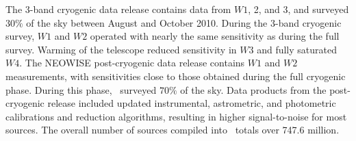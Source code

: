 The 3-band cryogenic data release contains data from $W1$, 2, and 3, and surveyed $30\%$ of the sky between August and October 2010. During the 3-band cryogenic survey, $W1$ and $W2$ operated with nearly the same sensitivity as during the full survey. Warming of the telescope reduced sensitivity in $W3$ and fully saturated $W4$. The NEOWISE post-cryogenic data release contains $W1$ and $W2$ measurements, with sensitivities close to those obtained during the full cryogenic phase. During this phase, \wise\, surveyed $70\%$ of the sky. Data products from the post-cryogenic release included updated instrumental, astrometric, and photometric calibrations and reduction algorithms, resulting in higher signal-to-noise for most sources. The overall number of sources compiled into \allwise\, totals over 747.6 million.



